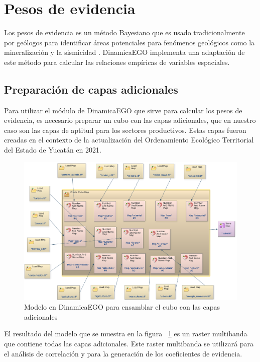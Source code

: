 \documentclass[12pt,a4paper,oldfontcommands]{article}
\begin{document}
\section{Pesos de evidencia}

Los pesos de evidencia es un método Bayesiano que es usado tradicionalmente por geólogos para identificar áreas potenciales para fenómenos geológicos como la mineralización y la sismicidad \cite{agterberg_1992}. DinamicaEGO implementa una adaptación de este método para calcular las relaciones empíricas de variables espaciales.

\subsection{Preparación de capas adicionales}
Para utilizar el módulo de DinamicaEGO que sirve para calcular los pesos de evidencia, es necesario preparar un cubo con las capas adicionales, que en nuestro caso son las capas de aptitud para los sectores productivos. Estas capas fueron creadas en el contexto de la actualización del Ordenamiento Ecológico Territorial del Estado de Yucatán en 2021. 
\bigskip
\begin{figure}[H]
	\centering
	\includegraphics[width=1\textwidth]{./figuras/cubo.png}
	\caption{Modelo en DinamicaEGO para ensamblar el cubo con las capas adicionales}
	\label{fig:cubo}
\end{figure}

El resultado del modelo que se muestra en la figura ~\ref{fig:cubo} es un raster multibanda que contiene todas las capas adicionales. Este raster multibanda se utilizará para el análisis de correlación y para la generación de los coeficientes de evidencia. 
 
\end{document}

